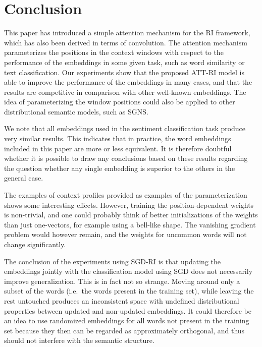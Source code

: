 \documentclass[11pt]{article}
\begin{document}
\section{Conclusion}

This paper has introduced a simple attention mechanism for the RI framework, which has also been derived in terms of convolution. The attention mechanism parameterizes the positions in the context windows with respect to the performance of the embeddings in some given task, such as word similarity or text classification. Our experiments show that the proposed ATT-RI model is able to improve the performance of the embeddings in many cases, and that the results are competitive in comparison with other well-known embeddings. The idea of parameterizing the window positions could also be applied to other distributional semantic models, such as SGNS. 

We note that all embeddings used in the sentiment classification task produce very similar results. This indicates that in practice, the word embeddings included in this paper are more or less equivalent. It is therefore doubtful whether it is possible to draw any conclusions based on these results regarding the question whether any single embedding is superior to the others in the general case.

The examples of context profiles provided as examples of the parameterization shows some interesting effects. However, training the position-dependent weights is non-trivial, and one could probably think of better initializations of the weights than just one-vectors, for example using a bell-like shape. The vanishing gradient problem would however remain, and the weights for uncommon words will not change significantly.

The conclusion of the experiments using SGD-RI is that updating the embeddings jointly with the classification model using SGD does not necessarily improve generalization. This is in fact not so strange. Moving around only a subset of the words (i.e.~the words present in the training set), while leaving the rest untouched produces an inconsistent space with undefined distributional properties between updated and non-updated embeddings. It could therefore be an idea to use randomized embeddings for all words not present in the training set because they then can be regarded as approximately orthogonal, and thus should not interfere with the semantic structure.

\end{document}
